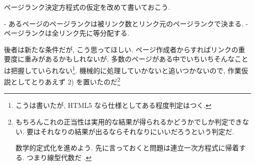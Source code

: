\documentclass[openany, a4paper, oneside]{jsbook}
\begin{document}
ページランク決定方程式の仮定を改めて書いておこう.
\begin{assump}
- あるページのページランクは被リンク数とリンク元のページランクで決まる.
- ページランクは全リンク先に等分配する.
\end{assump}
後者は新たな条件だが, こう思ってほしい.
ページ作成者からすればリンクの重要度に重みがあるかもしれないが,
多数のページがある中でいちいちそんなことは把握していられない\footnote{こうは書いたが, HTML5 なら仕様としてある程度判定はつく.}.
機械的に処理していかないと追いつかないので, 作業仮説としてとりあえず 2) を置いたのだ\footnote{もちろんこれの正当性は実用的な結果が得られるかどうかでしか判定できない.
要はそれなりの結果が出るならそれなりにいいだろうという判定だ.

数学的定式化を進めよう.
先に言っておくと問題は連立一次方程式に帰着する.
つまり線型代数だ \footnotemark.}
\end{document}

